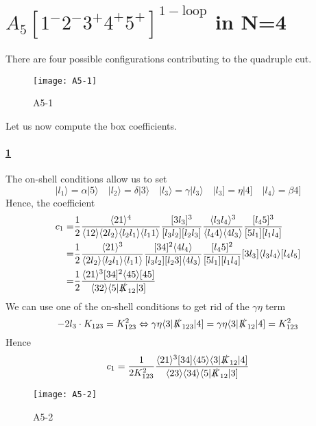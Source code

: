 \section{$A_5[1^-2^-3^+4^+5^+]^{\mathrm{1-loop}}$ in N=4}
There are four possible configurations contributing to the quadruple cut.
\begin{figure}[h!]
  \centering
    \texttt{[image: A5-1]}
    \caption{A5-1}
  \label{A5-1}
\end{figure}
Let us now compute the box coefficients.
%
\paragraph{\ref{A5-1}}
The on-shell conditions allow us to set
\begin{equation*}
|l_1\rangle = \alpha |5\rangle \quad
|l_2\rangle = \delta |3\rangle \quad
|l_3\rangle = \gamma |l_3\rangle\quad
|l_3] = \eta|4]\quad
|l_4\rangle = \beta 4]
\end{equation*}
Hence, the coefficient
\begin{equation*}
\begin{split}
c_1 = &
\frac{1}{2}\frac{\langle 2 1 \rangle^4}{\langle 1 2 \rangle \langle 2 l_2\rangle \langle l_2 l_1 \rangle\langle l_1 1 \rangle}
\frac{[3l_3]^3}{[l_3 l_2][l_2 l_3]}
\frac{\langle l_3 l_4 \rangle^{3}}{\langle l_4 4 \rangle \langle 4 l_3\rangle}
\frac{[l_4 5 ]^3}{[5l_1][l_1 l_4]}
\\
= & 
\frac{1}{2}\frac{\langle 2 1 \rangle^3}{\langle 2 l_2 \rangle\langle l_2 l_1 \rangle\langle l_1 1\rangle}
\frac{[34]^2\langle 4 l_4\rangle}{[l_3 l_2][l_2 3]\langle 4 l_3\rangle}
\frac{[l_4 5]^2}{[5l_1 ][l_1 l_4]}
[3 l_3]\langle l_3 l_4 \rangle [l_4 l_5]
\\
= &
\frac{1}{2}\frac{\langle 21 \rangle^3 [34]^2 \langle 45 \rangle [45]}{\langle 32 \rangle \langle 5 | \slashed{K}_{12}|3]}
\end{split}
\end{equation*}
%
\color{gray}
We can use one of the on-shell conditions to get rid of the $\gamma\eta$ term
\begin{equation*}
-2l_3\cdot K_{123} = K_{123}^2 \Leftrightarrow \gamma\eta\langle 3 | \slashed{K}_{123}|4] = \gamma\eta\langle 3 | \slashed{K}_{12}|4] = K_{123}^2
\end{equation*}
Hence 
\begin{equation*}
c_1 = \frac{1}{2 K_{123}^2}\frac{\langle 2 1 \rangle^3 [34]\langle 45 \rangle\langle 3 | \slashed{K}_{12}|4]}{\langle 23 \rangle\langle 34 \rangle \langle 5 |\slashed{K}_{12}|3]}
\end{equation*}
\color{black}
%
\begin{figure}[h!]
  \centering
    \texttt{[image: A5-2]}
    \caption{A5-2}
  \label{A5-2}
\end{figure}
